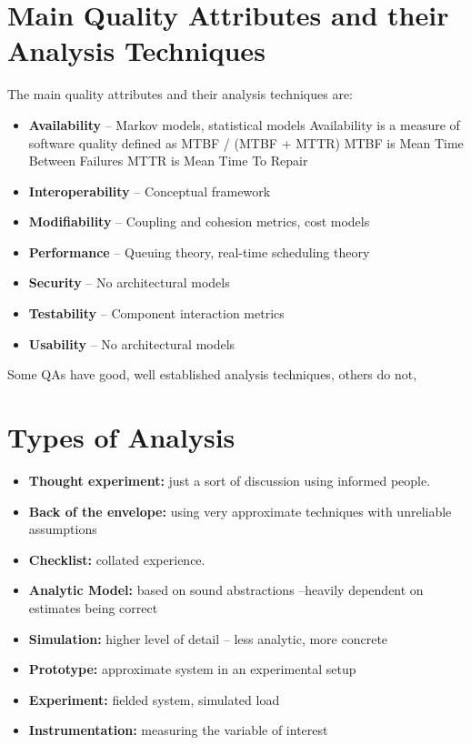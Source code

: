 \documentclass{report}
\begin{document}
\section{Main Quality Attributes and their Analysis Techniques}
The main quality attributes and their analysis techniques are:
\begin{itemize}

\item \textbf{Availability} – Markov models, statistical models \newline
Availability is a measure of software quality defined as MTBF / (MTBF + MTTR)
MTBF is Mean Time Between Failures
MTTR is Mean Time To Repair 

\item \textbf{Interoperability} – Conceptual framework 

\item \textbf{Modifiability} – Coupling and cohesion metrics, cost models

\item \textbf{Performance} – Queuing theory, real-time scheduling theory

\item \textbf{Security} – No architectural models

\item \textbf{Testability} – Component interaction metrics

\item \textbf{Usability} – No architectural models
\end{itemize}

Some QAs have good, well established analysis techniques, others do not,

\section{Types of Analysis}
\begin{itemize}
\item
\textbf{Thought experiment:} just a sort of discussion using informed people. 

\item
\textbf{Back of the envelope:} using very approximate techniques with unreliable assumptions

\item
\textbf{Checklist:} collated experience.

\item
\textbf{Analytic Model:} based on sound abstractions –heavily dependent on estimates being correct

\item
\textbf{Simulation:} higher level of detail – less analytic, more concrete 

\item
\textbf{Prototype:} approximate system in an experimental setup

\item
\textbf{Experiment:} fielded system, simulated load 

\item
\textbf{Instrumentation:} measuring the variable of interest
\end{itemize}
\end{document}
